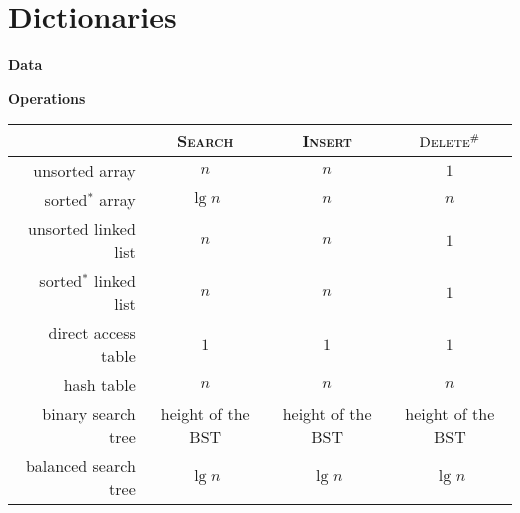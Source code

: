 \chapter{Dictionaries}

\begin{minipage}[t]{0.45\linewidth}
    \textbf{Data}

\end{minipage}
\begin{minipage}[t]{0.45\linewidth}
    \textbf{Operations}

\end{minipage}

\begin{table}[H]
    \centering
    \begin{tabular}{r | c c c}                                                                   \hline
                               & \textsc{Search}   & \textsc{Insert}   & $\textsc{Delete}^\#$ \\ \hline
        unsorted array         & $n$               & $n$               & $1$                  \\
        sorted$^*$ array       & $\lg n$           & $n$               & $n$                  \\
        unsorted linked list   & $n$               & $n$               & $1$                  \\
        sorted$^*$ linked list & $n$               & $n$               & $1$                  \\ \hline
        direct access table    & $1$               & $1$               & $1$                  \\
        hash table             & $n$               & $n$               & $n$                  \\ \hline
        binary search tree     & height of the BST & height of the BST & height of the BST    \\
        balanced search tree   & $\lg n$           & $\lg n$           & $\lg n$              \\ \hline
    \end{tabular}
\end{table}


